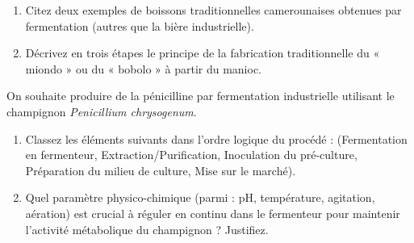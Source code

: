 \documentclass[11pt]{article}
\begin{document}
\begin{exercice}
\begin{enumerate}
    \item Citez deux exemples de boissons traditionnelles camerounaises obtenues par fermentation (autres que la bière industrielle).
    \item Décrivez en trois étapes le principe de la fabrication traditionnelle du « miondo » ou du « bobolo » à partir du manioc.
\end{enumerate}
\end{exercice}

\begin{exercice}
On souhaite produire de la pénicilline par fermentation industrielle utilisant le champignon \textit{Penicillium chrysogenum}.
\begin{enumerate}
    \item Classez les éléments suivants dans l'ordre logique du procédé : (Fermentation en fermenteur, Extraction/Purification, Inoculation du pré-culture, Préparation du milieu de culture, Mise sur le marché).
    \item Quel paramètre physico-chimique (parmi : pH, température, agitation, aération) est crucial à réguler en continu dans le fermenteur pour maintenir l'activité métabolique du champignon ? Justifiez.
\end{enumerate}
\end{exercice}
\end{document}
